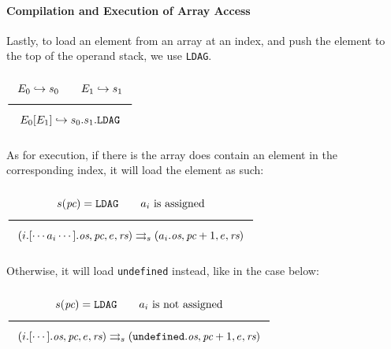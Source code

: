 \paragraph{Compilation and Execution of Array Access}

Lastly, to load an element from an array at an index,
and push the element to the top of the operand stack, we use \texttt{LDAG}.

$\Rule{
E_0 \translateaux s_0 \qquad E_1 \translateaux s_1}
{E_0\lbrack E_1\rbrack \translateaux s_0.s_1.\texttt{LDAG}}
$

As for execution, if there is the array does contain an element in the
corresponding index, it will load the element as such:

$\Rule{s(\textit{pc}) = \texttt{LDAG} \qquad a_i \text{ is assigned}}{
(i.\lbrack\cdots a_i\cdots\rbrack.\textit{os},\textit{pc},e,\textit{rs}) \transition
(a_i.\textit{os},\textit{pc}+1,e,\textit{rs})}
$

Otherwise, it will load \texttt{undefined} instead, like in the case below:

$\Rule{s(\textit{pc}) = \texttt{LDAG} \qquad a_i \text{ is not assigned}}{
(i.\lbrack\cdots\rbrack.\textit{os},\textit{pc},e,\textit{rs}) \transition
(\texttt{undefined}.\textit{os},\textit{pc}+1,e,\textit{rs})}
$
